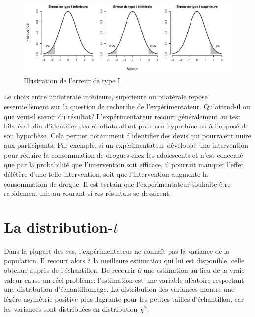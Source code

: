 \documentclass[
]{book}
\begin{document}
\begin{figure}

{\centering \includegraphics{08-Inferer_files/figure-latex/tt-1} 

}

\caption{Illustration de l'erreur de type I}\label{fig:tt}
\end{figure}

Le choix entre unilatérale inférieure, supérieure ou bilatérale repose essentiellement sur la question de recherche de l'expérimentateur. Qu'attend-il ou que veut-il savoir du résultat? L'expérimentateur recourt généralement au test bilatéral afin d'identifier des résultats allant pour son hypothèse ou à l'opposé de son hypothèse. Cela permet notamment d'identifier des devis qui pourraient nuire aux participants. Par exemple, si un expérimentateur développe une intervention pour réduire la consommation de drogues chez les adolescents et n'est concerné que par la probabilité que l'intervention soit efficace, il pourrait manquer l'effet délétère d'une telle intervention, soit que l'intervention augmente la consommation de drogue. Il est certain que l'expérimentateur souhaite être rapidement mis au courant si ces résultats se dessinent.

\hypertarget{la-distribution-t}{%
\section{\texorpdfstring{La distribution-\(t\)}{La distribution-t}}\label{la-distribution-t}}

Dans la plupart des cas, l'expérimentateur ne connaît pas la variance de la population. Il recourt alors à la meilleure estimation qui lui est disponible, celle obtenue auprès de l'échantillon. De recourir à une estimation au lieu de la vraie valeur cause un réel problème: l'estimation est une variable aléatoire respectant une distribution d'échantillonnage. La distribution des variances montre une légère asymétrie positive plus flagrante pour les petites tailles d'échantillon, car les variances sont distribuées en distribution-\(\chi^2\).
\end{document}
